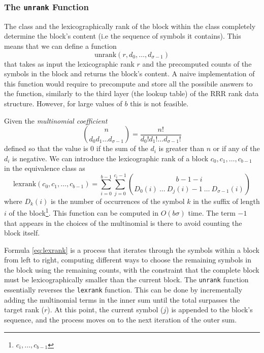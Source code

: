 \subsubsection*{The \texttt{unrank} Function}

\noindent The class and the lexicographically rank of the block within the class completely determine the block's content (i.e the sequence of symbols it contains). This means that we can define a function
$$\textrm{unrank}(r,d_0, \dots, d_{\sigma-1})$$
that takes as input the lexicographic rank $r$ and the precomputed counts of the symbols in the block and returns the block's content. A naive implementation of this function would require to precompute and store all the possibile answers to the function, similarly to the third layer (the lookup table) of the RRR rank data structure. However, for large values of $b$ this is not feasible. \vspace{0.4cm}

\noindent Given the \emph{multinomial coefficient}
\begin{equation} \label{eq:multinomial}
    \binom{n}{d_0d_1 \dots d_{\sigma-1}} = \frac{n!}{d_0!d_1! \dots d_{\sigma-1}!}
\end{equation}
defined so that the value is $0$ if the sum of the $d_i$ is greater than $n$ or if any of the $d_i$ is negative. We can introduce the lexicographic rank of a block $c_0, c_1, \dots, c_{b-1}$ in the equivalence class as
\begin{equation} \label{eq:lexrank}
    \textrm{lexrank}(c_0, c_1, \dots, c_{b-1}) = \sum_{i=0}^{b-1} \sum_{j=0}^{c_i -1} \binom{b-1-i}{D_0(i) ~ \dots ~ D_j(i) -1 ~ \dots ~ D_{\sigma-1}(i)}
\end{equation}
where $D_k(i)$ is the number of occurrences of the symbol $k$ in the suffix of length $i$ of the block\footnote{$c_i, \dots, c_{b-1}$}. This function can be computed in $O(b \sigma)$ time. The term $-1$ that appears in the choices of the multinomial is there to avoid counting the block itself. \vspace{0.4cm}

\noindent Formula \ref{eq:lexrank} is a process that iterates through the symbols within a block from left to right, computing different ways to choose the remaining symbols in the block using the remaining counts, with the constraint that the complete block must be lexicographically smaller than the current block. The \texttt{unrank} function essentially reverses the \texttt{lexrank} function. This can be done by incrementally adding the multinomial terms in the inner sum until the total surpasses the target rank ($r$). At this point, the current symbol ($j$) is appended to the block's sequence, and the process moves on to the next iteration of the outer sum. \vspace{0.4cm}

